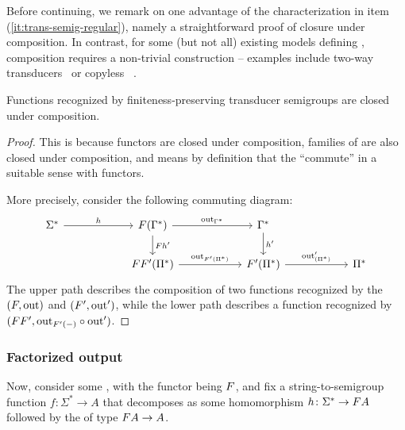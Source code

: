 Before continuing, we remark on one advantage of the characterization in item
(\ref{it:trans-semig-regular}), namely a straightforward proof of closure under
composition. In contrast, for some (but not all) existing models defining
, composition requires a non-trivial
construction -- examples include two-way transducers~\cite[Theorem 2]{ChytilJ77}
or copyless ~\cite[Theorem 1]{composingSST}.
\begin{proposition}\label{prop:composition}
  Functions recognized by finiteness-preserving transducer semigroups are closed
  under composition.
\end{proposition}
\begin{proof}
  This is because  functors are closed under composition,
   families of  are also closed under composition, and 
  means by definition that the  \enquote{commute} in a suitable
  sense with functors.

  More precisely, consider the following commuting  diagram:
    \[
      \begin{tikzcd}[ampersand replacement=\&, column sep=2cm]
        \Sigma^* 
        \ar[r,"h"]
        \& 
        \functor(\Gamma^*)
        \ar[r,"\outfun_{\Gamma^*}"]
        \ar[d,"\functor h'"]
        \&
        \Gamma^* \ar[d,"h'"]\\
        \&
        \functor\functor'(\Pi^*) \ar[r,"\outfun_{\functor'(\Pi^*)}"]
        \& 
        \functor'(\Pi^*)
        \ar[r,"\outfun'_{(\Pi^*)}"]
        \&
        \Pi^*
      \end{tikzcd}
  \]
  The upper path describes the composition of two functions recognized by the
   $(\functor,\outfun)$ and $(\functor',\outfun')$,
  while the lower path describes a function recognized by $(\functor\functor',
  \outfun_{\functor'(-)} \circ \outfun')$.
\end{proof}





\subsubsection{Factorized output}
Now, consider some , with the functor being $\functor$, and fix a string-to-semigroup function $f\colon \Sigma^* \to A$ that decomposes as some homomorphism $h\colon \Sigma^* \to \functor A$ followed by the  of type $\functor A \to A$. 

